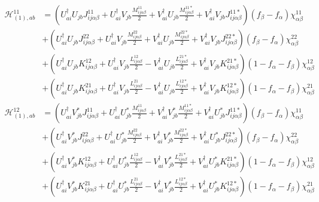 \begin{align*}
\mathcal{H}_{(1),ab}^{11} &= \left(U_{ai}^\dagger U_{jb} J_{ij\alpha\beta}^{11} + U_{ai}^\dagger V_{jb} \frac{M_{ij\alpha\beta}^{11}}{2} + V_{ai}^\dagger U_{jb} \frac{M_{ij\alpha\beta}^{11*}}{2} + V_{ai}^\dagger V_{jb} J_{ij\alpha\beta}^{11*}  \right)(f_\beta-f_\alpha)\chi^{11}_{\alpha\beta} \\
&+ \left(U_{ai}^\dagger U_{jb} J_{ij\alpha\beta}^{22} + U_{ai}^\dagger V_{jb} \frac{M_{ij\alpha\beta}^{22}}{2} + V_{ai}^\dagger U_{jb} \frac{M_{ij\alpha\beta}^{22*}}{2} + V_{ai}^\dagger V_{jb} J_{ij\alpha\beta}^{22*}  \right)(f_\beta-f_\alpha)\chi^{22}_{\alpha\beta} \\
&+ \left(U_{ai}^\dagger U_{jb} K_{ij\alpha\beta}^{12} + U_{ai}^\dagger V_{jb} \frac{L_{ij\alpha\beta}^{12}}{2} - V_{ai}^\dagger U_{jb} \frac{L_{ij\alpha\beta}^{21*}}{2} + V_{ai}^\dagger V_{jb} K_{ij\alpha\beta}^{21*}  \right)\left(1-f_\alpha-f_\beta\right)\chi^{12}_{\alpha\beta} \\
&+ \left(U_{ai}^\dagger U_{jb} K_{ij\alpha\beta}^{21} + U_{ai}^\dagger V_{jb} \frac{L_{ij\alpha\beta}^{21}}{2} - V_{ai}^\dagger U_{jb} \frac{L_{ij\alpha\beta}^{12*}}{2} + V_{ai}^\dagger V_{jb} K_{ij\alpha\beta}^{12*}  \right)\left(1-f_\alpha-f_\beta\right)\chi^{21}_{\alpha\beta}
\end{align*}
\begin{align*}
\mathcal{H}_{(1),ab}^{12} &= \left(U_{ai}^\dagger V^*_{jb} J_{ij\alpha\beta}^{11} + U_{ai}^\dagger U^*_{jb} \frac{M_{ij\alpha\beta}^{11}}{2} + V_{ai}^\dagger V^*_{jb} \frac{M_{ij\alpha\beta}^{11*}}{2} + V_{ai}^\dagger U^*_{jb} J_{ij\alpha\beta}^{11*}  \right)(f_\beta-f_\alpha)\chi^{11}_{\alpha\beta} \\
&+ \left(U_{ai}^\dagger V^*_{jb} J_{ij\alpha\beta}^{22} + U_{ai}^\dagger U^*_{jb} \frac{M_{ij\alpha\beta}^{22}}{2} + V_{ai}^\dagger V^*_{jb} \frac{M_{ij\alpha\beta}^{22*}}{2} + V_{ai}^\dagger U^*_{jb} J_{ij\alpha\beta}^{22*}  \right)(f_\beta-f_\alpha)\chi^{22}_{\alpha\beta} \\
&+ \left(U_{ai}^\dagger V^*_{jb} K_{ij\alpha\beta}^{12} + U_{ai}^\dagger U^*_{jb} \frac{L_{ij\alpha\beta}^{12}}{2} - V_{ai}^\dagger V^*_{jb} \frac{L_{ij\alpha\beta}^{21*}}{2} + V_{ai}^\dagger U^*_{jb} K_{ij\alpha\beta}^{21*}  \right)\left(1-f_\alpha-f_\beta\right)\chi^{12}_{\alpha\beta} \\
&+ \left(U_{ai}^\dagger V^*_{jb} K_{ij\alpha\beta}^{21} + U_{ai}^\dagger U^*_{jb} \frac{L_{ij\alpha\beta}^{21}}{2} - V_{ai}^\dagger V^*_{jb} \frac{L_{ij\alpha\beta}^{12*}}{2} + V_{ai}^\dagger U^*_{jb} K_{ij\alpha\beta}^{12*}  \right)\left(1-f_\alpha-f_\beta\right)\chi^{21}_{\alpha\beta}
\end{align*}
